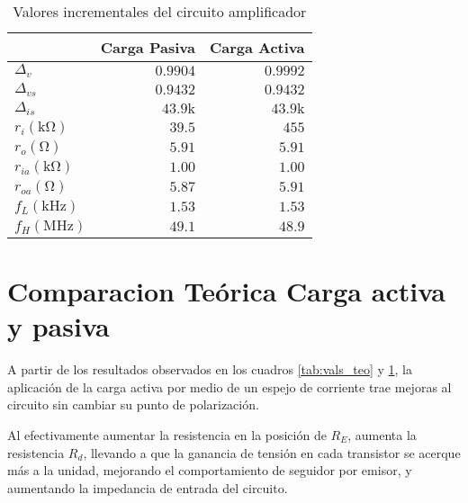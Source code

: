 \begin{table}[ht!]
    \centering
    \begin{tabular}{|l|r|r|}
        \hline
         & \multicolumn{1}{c|}{Carga Pasiva} & \multicolumn{1}{c|}{Carga Activa} \\ \hline
        $\Delta_{v}$    & $0.9904$        & $0.9992$ \\
        $\Delta_{vs}$   & $0.9432$        & $0.9432$ \\ 
        $\Delta_{is}$   & $43.9\si{\kilo}$& $43.9\si{\kilo}$ \\ 
        $r_{i}(\si{\kilo\ohm})$ & $39.5$ & $455$ \\ 
        $r_{o}(\si{\ohm})$      & $5.91$ & $5.91$ \\
        $r_{ia}(\si{\kilo\ohm})$ & $1.00$ & $1.00$ \\ 
        $r_{oa}(\si{\ohm})$      & $5.87$ & $5.91$ \\
        $f_L(\si{\kilo\hertz})$  & $1.53$ & $1.53$  \\
        $f_H(\si{\mega\hertz})$  & $49.1$ & $48.9$  \\ \hline
    \end{tabular}
    \caption{Valores incrementales del circuito amplificador}
    \label{tab:vals_teo_sys}
\end{table}

\section{Comparacion Teórica Carga activa y pasiva}

A partir de los resultados observados en los cuadros \ref{tab:vals_teo} y \ref{tab:vals_teo_sys}, la aplicación de la carga activa por medio de un espejo de corriente trae mejoras al circuito sin cambiar su punto de polarización.

Al efectivamente aumentar la resistencia en la posición de $R_E$, aumenta la resistencia $R_d$, llevando a que la ganancia de tensión en cada transistor se acerque más a la unidad, mejorando el comportamiento de seguidor por emisor, y aumentando la impedancia de entrada del circuito.

